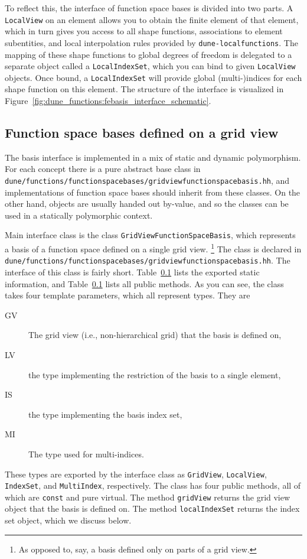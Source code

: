 \documentclass[a4paper,10pt,headings=normal,bibliography=totoc]{scrartcl}
\newcommand{\cpp}[1]{\lstinline[basicstyle=\ttfamily]!#1!}
\newcommand{\dunemodule}[1]{\texttt{#1}}
\newcommand{\file}[1]{\texttt{#1}}
\begin{document}
To reflect this, the interface of function space bases is divided into two parts.  A \cpp{LocalView} on an
element allows you to obtain the finite element of that element, which in turn gives you access to all
shape functions, associations to element subentities, and local interpolation rules provided by
\dunemodule{dune-localfunctions}.  The mapping of these shape functions to global degrees of freedom is
delegated to a separate object called a \cpp{LocalIndexSet}, which you can bind to given
\cpp{LocalView} objects.  Once bound, a \cpp{LocalIndexSet} will provide global (multi-)indices
for each shape function on this element.  The structure of the interface is visualized in
Figure~\ref{fig:dune_functions:febasis_interface_schematic}.

\subsection{Function space bases defined on a grid view}

The basis interface is implemented in a mix of static and dynamic polymorphism.  For each concept
there is a pure abstract base class in \file{dune/functions/functionspacebases/gridviewfunctionspacebasis.hh},
and implementations of function space bases should inherit from these classes.  On the other hand,
objects are usually handed out by-value, and so the classes can be used in a statically polymorphic
context.

Main interface class is the class \cpp{GridViewFunctionSpaceBasis}, which represents a basis of a
function space defined on a single grid view.%
\footnote{As opposed to, say, a basis defined only on parts of a grid view.}
The class is declared in
\file{dune/functions/functionspacebases/gridviewfunctionspacebasis.hh}.  The interface of this class
is fairly short.  Table~\ref{} lists the exported static information,
and Table~\ref{} lists all public methods.
As you can see, the class takes four template parameters, which all represent types.  They are
\begin{description}
 \item [GV] The grid view (i.e., non-hierarchical grid) that the basis is defined on,
 \item [LV] the type implementing the restriction of the basis to a single element,
 \item [IS] the type implementing the basis index set,
 \item [MI] The type used for multi-indices.
\end{description}
These types are exported by the interface class as \cpp{GridView}, \cpp{LocalView}, \cpp{IndexSet}, and
\cpp{MultiIndex}, respectively.  The class has four public methods, all of which are \cpp{const}
and pure virtual.  The method \cpp{gridView} returns the grid view object that the basis is
defined on.  The method \cpp{localIndexSet} returns the index set object, which we discuss below.
\end{document}
